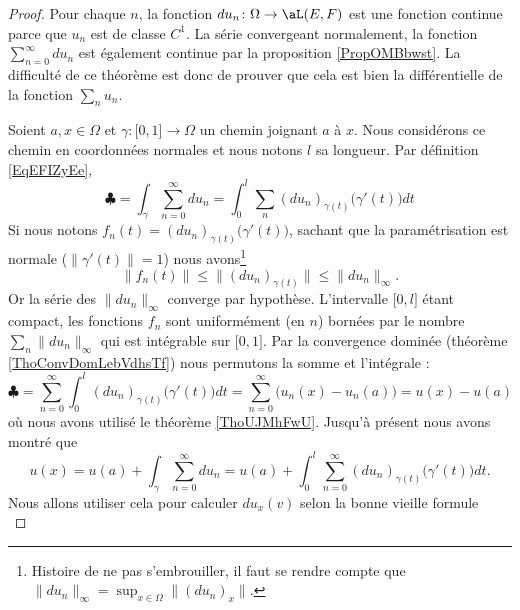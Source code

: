 \begin{proof}
    Pour chaque \( n\), la fonction \( du_n\colon \Omega\to \aL(E,F)\) est une fonction continue parce que \( u_n\) est de classe \( C^1\). La série convergeant normalement, la fonction \( \sum_{n=0}^{\infty}du_n\) est également continue par la proposition \ref{PropOMBbwst}. La difficulté de ce théorème est donc de prouver que cela est bien la différentielle de la fonction \( \sum_nu_n\).

    Soient \( a,x\in \Omega\) et \( \gamma\colon \mathopen[ 0 , 1 \mathclose]\to \Omega\) un chemin joignant \( a\) à \( x\). Nous considérons ce chemin en coordonnées normales et nous notons \( l\) sa longueur. Par définition \eqref{EqEFIZyEe},
    \begin{equation}
        \clubsuit=\int_{\gamma}\sum_{n=0}^{\infty}du_n=\int_0^l\sum_n(du_n)_{\gamma(t)}\big( \gamma'(t) \big)dt
    \end{equation}
    Si nous notons \( f_n(t)=(du_n)_{\gamma(t)}\big( \gamma'(t) \big)\), sachant que la paramétrisation est normale (\( \| \gamma'(t) \|=1\)) nous avons\footnote{Histoire de ne pas s'embrouiller, il faut se rendre compte que \( \| du_n \|_{\infty}=\sup_{x\in \Omega}\| (du_n)_x \|\).}
    \begin{equation}
        \| f_n(t) \|\leq \|   (du_n)_{\gamma(t)}  \|\leq \| du_n \|_{\infty}.
    \end{equation}
    Or la série des \( \| du_n \|_{\infty}\) converge par hypothèse. L'intervalle \( \mathopen[ 0 , l \mathclose]\) étant compact, les fonctions \( f_n\) sont uniformément (en \( n\)) bornées par le nombre \( \sum_n\| du_n \|_{\infty}\) qui est intégrable sur \( \mathopen[ 0 , 1 \mathclose]\). Par la convergence dominée (théorème \ref{ThoConvDomLebVdhsTf}) nous permutons la somme et l'intégrale :
    \begin{equation}
        \clubsuit=\sum_{n=0}^{\infty}\int_0^l(du_n)_{\gamma(t)}\big( \gamma'(t) \big)dt=\sum_{n=0}^{\infty}\big( u_n(x)-u_n(a)\big)=u(x)-u(a)
    \end{equation}
    où nous avons utilisé le théorème \ref{ThoUJMhFwU}. Jusqu'à présent nous avons montré que
    \begin{equation}
        u(x)=u(a)+\int_{\gamma}\sum_{n=0}^{\infty}du_n=u(a)+\int_0^l\sum_{n=0}^{\infty}(du_n)_{\gamma(t)}\big( \gamma'(t) \big)dt.
    \end{equation}
    Nous allons utiliser cela pour calculer \( du_x(v)\) selon la bonne vieille formule
    \begin{equation}

\end{equation}
\end{proof}
